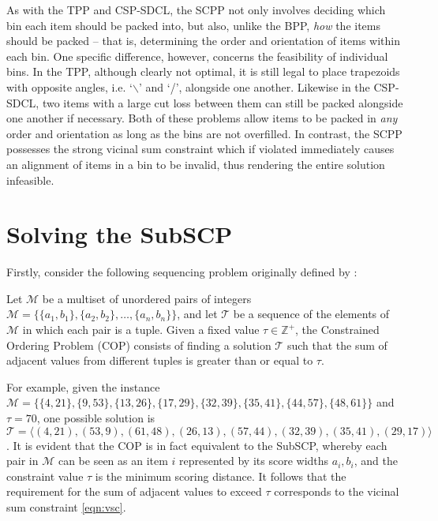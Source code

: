 \documentclass[authoryear]{elsarticle}
\begin{document}
As with the TPP and CSP-SDCL, the SCPP not only involves deciding which bin each item should be packed into, but also, unlike the BPP, \emph{how} the items should be packed -- that is, determining the order and orientation of items within each bin. One specific difference, however, concerns the feasibility of individual bins. In the TPP, although clearly not optimal, it is still legal to place trapezoids with opposite angles, i.e. `$\backslash$' and `/', alongside one another. Likewise in the CSP-SDCL, two items with a large cut loss between them can still be packed alongside one another if necessary. Both of these problems allow items to be packed in \emph{any} order and orientation as long as the bins are not overfilled. In contrast, the SCPP possesses the strong vicinal sum constraint which if violated immediately causes an alignment of items in a bin to be invalid, thus rendering the entire solution infeasible.

\section{Solving the SubSCP}
\label{sec:ahc}
\noindent Firstly, consider the following sequencing problem originally defined by \citet{hawa2018}:

\begin{definition} %
	\label{defn:cop}
	Let $\mathcal{M}$ be a multiset of unordered pairs of integers $\mathcal{M} = \{\{a_1, b_1\}, \{a_2, b_2\},\dotsc,\{a_n, b_n\}\}$, and let $\mathcal{T}$ be a sequence of the elements of $\mathcal{M}$ in which each pair is a tuple. Given a fixed value $\tau \in \mathbb{Z}^+$, the Constrained Ordering Problem (COP) consists of finding a solution $\mathcal{T}$ such that the sum of adjacent values from different tuples is greater than or equal to $\tau$.
\end{definition}

\noindent For example, given the instance $\mathcal{M} = \{\{4,21\}, \{9,53\}, \{13,26\}, \{17,29\}, \{32,39\}, \{35,41\}, \{44,57\}, \{48,61\} \}$ and $\tau = 70$, one possible solution is $\mathcal{T} = \langle(4,21), (53,9), (61,48), (26,13), (57,44), (32,39), (35,41), (29,17)\rangle$. It is evident that the COP is in fact equivalent to the SubSCP, whereby each pair in $\mathcal{M}$ can be seen as an item $i$ represented by its score widths $a_i, b_i$, and the constraint value $\tau$ is the minimum scoring distance. It follows that the requirement for the sum of adjacent values to exceed $\tau$ corresponds to the vicinal sum constraint \eqref{eqn:vsc}.
\end{document}
